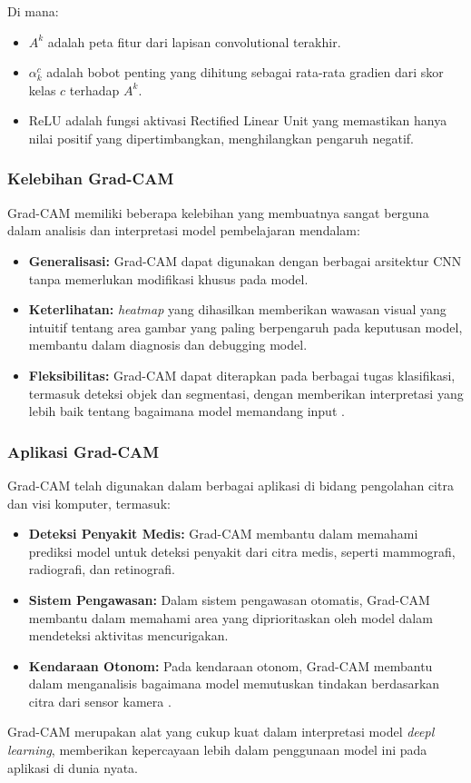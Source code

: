 Di mana:

\begin{itemize}
    \item \(A^k\) adalah peta fitur dari lapisan convolutional terakhir.
    \item \(\alpha_k^c\) adalah bobot penting yang dihitung sebagai rata-rata gradien dari skor kelas \(c\) terhadap \(A^k\).
    \item \(\text{ReLU}\) adalah fungsi aktivasi Rectified Linear Unit yang memastikan hanya nilai positif yang dipertimbangkan, menghilangkan pengaruh negatif.
\end{itemize}

\subsubsection{Kelebihan Grad-CAM}

Grad-CAM memiliki beberapa kelebihan yang membuatnya sangat berguna dalam analisis dan interpretasi model pembelajaran mendalam:

\begin{itemize}
    \item \textbf{Generalisasi:} Grad-CAM dapat digunakan dengan berbagai arsitektur CNN tanpa memerlukan modifikasi khusus pada model.
    \item \textbf{Keterlihatan:} \emph{heatmap} yang dihasilkan memberikan wawasan visual yang intuitif tentang area gambar yang paling berpengaruh pada keputusan model, membantu dalam diagnosis dan debugging model.
    \item \textbf{Fleksibilitas:} Grad-CAM dapat diterapkan pada berbagai tugas klasifikasi, termasuk deteksi objek dan segmentasi, dengan memberikan interpretasi yang lebih baik tentang bagaimana model memandang input \parencite{selvaraju2017grad}.
\end{itemize}

\subsubsection{Aplikasi Grad-CAM}

Grad-CAM telah digunakan dalam berbagai aplikasi di bidang pengolahan citra dan visi komputer, termasuk:

\begin{itemize}
    \item \textbf{Deteksi Penyakit Medis:} Grad-CAM membantu dalam memahami prediksi model untuk deteksi penyakit dari citra medis, seperti mammografi, radiografi, dan retinografi.
    \item \textbf{Sistem Pengawasan:} Dalam sistem pengawasan otomatis, Grad-CAM membantu dalam memahami area yang diprioritaskan oleh model dalam mendeteksi aktivitas mencurigakan.
    \item \textbf{Kendaraan Otonom:} Pada kendaraan otonom, Grad-CAM membantu dalam menganalisis bagaimana model memutuskan tindakan berdasarkan citra dari sensor kamera \parencite{selvaraju2017grad}.
\end{itemize}

Grad-CAM merupakan alat yang cukup kuat dalam interpretasi model \emph{deepl learning}, memberikan kepercayaan lebih dalam penggunaan model ini pada aplikasi di dunia nyata.

